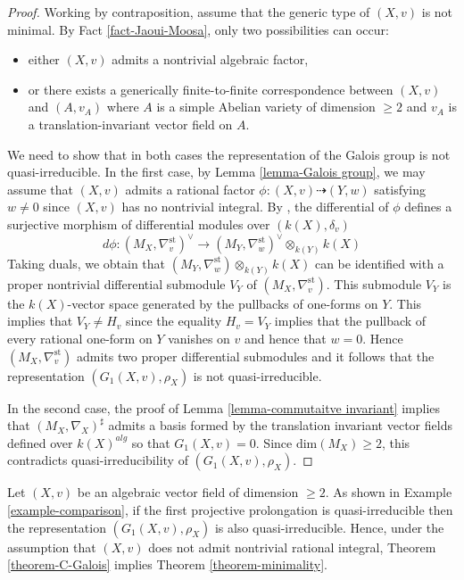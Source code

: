 \documentclass[12pt]{amsart}
\theoremstyle{definition}
\theoremstyle{plain}
\theoremstyle{exampstyle}
\theoremstyle{exampstyle}\newtheorem{thmxbis}{Theorem}
\numberwithin{equation}{section}
\theoremstyle{remark}
\begin{document}
\begin{proof} 
Working by contraposition, assume that the generic type of $(X,v)$ is not minimal. By Fact \ref{fact-Jaoui-Moosa}, only two possibilities can occur: 
\begin{itemize} 
\item[(a)] either $(X,v)$ admits a nontrivial algebraic factor, 
\item[(b)] or there exists a generically finite-to-finite correspondence between $(X,v)$ and $(A,v_A)$ where $A$ is a simple Abelian variety of dimension $\geq 2$ and $v_A$ is a translation-invariant vector field on $A$.
\end{itemize}
We need to show that in both cases the representation of the Galois group is not quasi-irreducible.  In the first case, by Lemma \ref{lemma-Galois group}, we may assume that $(X,v)$ admits a rational factor $\phi: (X,v) \dashrightarrow (Y,w)$ satisfying $w \neq 0$ since $(X,v)$ has no nontrivial integral. By  \cite[Proposition 1.5.1]{jaoui-Confluentes}, the differential of $\phi$ defines a surjective morphism of differential modules over $(k(X), \delta_v)$ 
$$ d\phi: (M_X,\nabla^{\mathrm{st}}_v)^\vee \rightarrow (M_Y,\nabla^{\mathrm{st}}_w)^\vee \otimes_{k(Y)} k(X) $$
Taking duals, we obtain that 
$(M_Y,\nabla^{\mathrm{st}}_w)\otimes_{k(Y)} k(X)$ can be identified with a proper nontrivial differential submodule $V_Y$ of $(M_X,\nabla_v^{\mathrm{st}})$. This submodule $V_Y$ is the $k(X)$-vector space generated by the pullbacks of one-forms on $Y$. This implies that $V_Y \neq H_v$ since the equality $H_v  = V_Y$ implies that the pullback of every rational one-form on $Y$ vanishes on $v$ and hence that $w = 0$. Hence $(M_X, \nabla^{\mathrm{st}}_v)$ admits two proper differential submodules and it follows that the representation $(G_1(X,v), \rho_X)$ is not quasi-irreducible. 


In the second case, the proof of Lemma \ref{lemma-commutaitve invariant} implies that $(M_X,\nabla_X)^\sharp$ admits a basis formed by the translation invariant vector fields defined over $k(X)^{alg}$ so that $G_1(X,v) = 0$. Since $\mathrm{dim}(M_X) \geq 2$, this contradicts quasi-irreducibility of $(G_1(X,v), \rho_X)$.  
\end{proof}  


{\remark Let $(X,v)$ be an algebraic vector field of dimension $\geq 2$. As shown in Example \ref{example-comparison}, if the first projective prolongation is quasi-irreducible then the representation $(G_1(X,v), \rho_X)$ is also quasi-irreducible. Hence, under the assumption that $(X,v)$ does not admit nontrivial rational integral, Theorem \ref{theorem-C-Galois} implies Theorem \ref{theorem-minimality}.}
\end{document}
